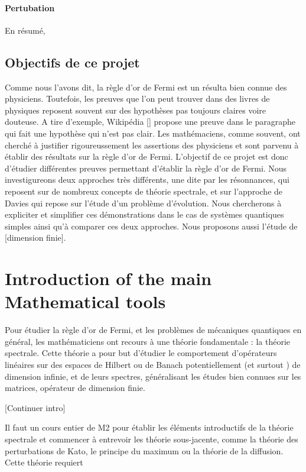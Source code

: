 \documentclass[12pt,openany,a4paper, titlepage]{article}
\theoremstyle{definition}
\theoremstyle{definition}
\theoremstyle{definition}
\theoremstyle{definition}
\theoremstyle{definition}
\theoremstyle{definition}
\begin{document}
\paragraph{Pertubation}


En résumé, 

\subsection{Objectifs de ce projet}

Comme nous l'avons dit, la règle d'or de Fermi est un résulta bien connue des physiciens. Toutefois, les preuves que l'on peut trouver dans des livres de physiques reposent souvent sur des hypothèses pas toujours claires voire douteuse. A tire d'exemple, Wikipédia [] propose une preuve dans le paragraphe qui fait une hypothèse qui n'est pas clair. Les mathémaciens, comme souvent, ont cherché à justifier rigoureussement les assertions des physiciens et sont parvenu à établir des résultats sur la règle d'or de Fermi. L'objectif de ce projet est donc d'étudier différentes preuves permettant d'établir la règle d'or de Fermi. Nous investigureons deux approches très différents, une dite par les résonnances, qui reposent sur de nombreux concepts de théorie spectrale, et sur l'approche de Davies qui repose sur l'étude d'un problème d'évolution. Nous chercherons à expliciter et simplifier ces démonstrations  dans le cas de systèmes quantiques simples ainsi qu'à comparer ces deux approches. Nous proposons aussi l'étude de [dimension finie]. 

\section{Introduction of the main Mathematical tools}

Pour étudier la règle d'or de Fermi, et les problèmes de mécaniques quantiques en général, les mathématiciens ont recours à une théorie fondamentale : la théorie spectrale. Cette théorie a pour but d'étudier le comportement d'opérateurs linéaires sur des espaces de Hilbert ou de Banach potentiellement (et surtout ) de dimension infinie, et de leurs spectres, généralisant les études bien connues sur les matrices, opérateur de dimension finie. 

[Continuer intro]

Il faut un cours entier de M2 pour établir les éléments introductifs de la théorie spectrale et commencer à entrevoir les théorie sous-jacente, comme la théorie des perturbations de Kato, le principe du maximum ou la théorie de la diffusion. Cette théorie requiert 
\end{document}
